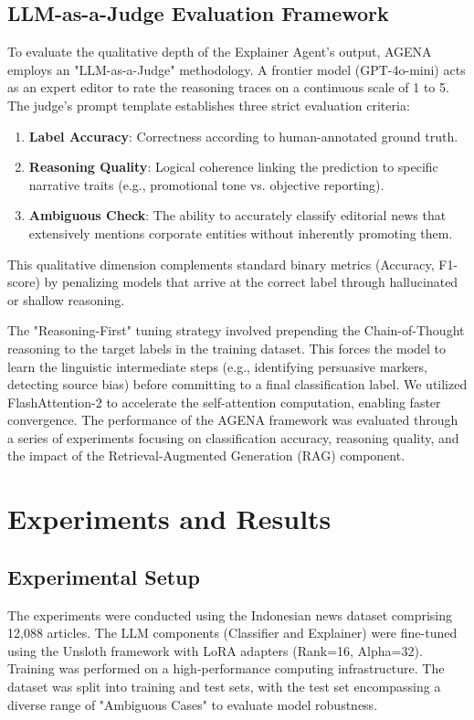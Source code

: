 \documentclass{ieeeaccess}
\begin{document}
\subsection{LLM-as-a-Judge Evaluation Framework}
To evaluate the qualitative depth of the Explainer Agent's output, AGENA employs an "LLM-as-a-Judge" methodology. A frontier model (GPT-4o-mini) acts as an expert editor to rate the reasoning traces on a continuous scale of 1 to 5. The judge's prompt template establishes three strict evaluation criteria:
\begin{enumerate}
    \item \textbf{Label Accuracy}: Correctness according to human-annotated ground truth.
    \item \textbf{Reasoning Quality}: Logical coherence linking the prediction to specific narrative traits (e.g., promotional tone vs. objective reporting).
    \item \textbf{Ambiguous Check}: The ability to accurately classify editorial news that extensively mentions corporate entities without inherently promoting them.
\end{enumerate}
This qualitative dimension complements standard binary metrics (Accuracy, F1-score) by penalizing models that arrive at the correct label through hallucinated or shallow reasoning.

The "Reasoning-First" tuning strategy involved prepending the Chain-of-Thought reasoning to the target labels in the training dataset. This forces the model to learn the linguistic intermediate steps (e.g., identifying persuasive markers, detecting source bias) before committing to a final classification label. We utilized FlashAttention-2 to accelerate the self-attention computation, enabling faster convergence.
The performance of the AGENA framework was evaluated through a series of experiments focusing on classification accuracy, reasoning quality, and the impact of the Retrieval-Augmented Generation (RAG) component.

\section{Experiments and Results}
\label{sec:experiments}
\subsection{Experimental Setup}
The experiments were conducted using the Indonesian news dataset comprising 12,088 articles. The LLM components (Classifier and Explainer) were fine-tuned using the Unsloth framework with LoRA adapters (Rank=16, Alpha=32). Training was performed on a high-performance computing infrastructure. The dataset was split into training and test sets, with the test set encompassing a diverse range of "Ambiguous Cases" to evaluate model robustness.
\end{document}

